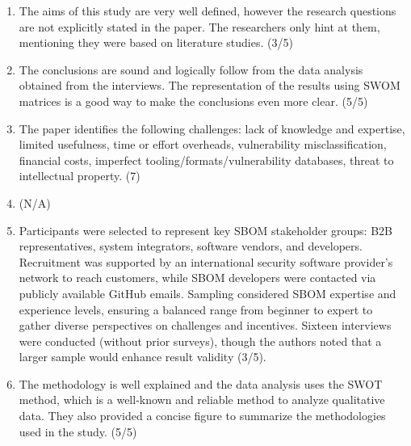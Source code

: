 \begin{enumerate}
    \item The aims of this study are very well defined, however the research questions are not explicitly stated in the paper. The researchers only hint at them, mentioning they were based on literature studies. (3/5)
    \item The conclusions are sound and logically follow from the data analysis obtained from the interviews. The representation of the results using SWOM matrices is a good way to make the conclusions even more clear. (5/5)
    \item The paper identifies the following challenges: lack of knowledge and expertise, limited usefulness, time or effort overheads, vulnerability misclassification, financial costs, imperfect tooling/formats/vulnerability databases, threat to intellectual property. (7)
    \item (N/A)
    \item Participants were selected to represent key SBOM stakeholder groups: B2B representatives, system integrators, software vendors, and developers. Recruitment was supported by an international security software provider's network to reach customers, while SBOM developers were contacted via publicly available GitHub emails. Sampling considered SBOM expertise and experience levels, ensuring a balanced range from beginner to expert to gather diverse perspectives on challenges and incentives. Sixteen interviews were conducted (without prior surveys), though the authors noted that a larger sample would enhance result validity (3/5).
    \item The methodology is well explained and the data analysis uses the SWOT method, which is a well-known and reliable method to analyze qualitative data. They also provided a concise figure to summarize the methodologies used in the study. (5/5)
\end{enumerate}

